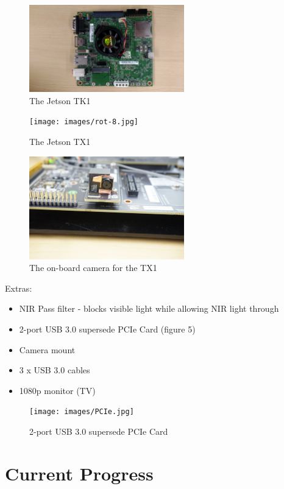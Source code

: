 \documentclass[letterpaper,10pt,titlepage]{IEEEtran}
\begin{document}
 \begin{figure}[!ht]
  \caption{The Jetson TK1}
	  \centering
		    \includegraphics[width=0.6\textwidth,natwidth=610,natheight=642]{images/rot-9.jpg}
				\end{figure}
\begin{figure}[!ht]
  \caption{The Jetson TX1}
	  \centering
		    \texttt{[image: images/rot-8.jpg]}
				\end{figure}
\begin{figure}[!ht]
  \caption{The on-board camera for the TX1}
	  \centering
		    \includegraphics[width=0.6\textwidth,natwidth=610,natheight=642]{images/onboardCamera.JPG}
				\end{figure}
	Extras: 
		\begin{itemize}
		\item NIR Pass filter - blocks visible light while allowing NIR light through
		\item 2-port USB 3.0 supersede PCIe Card (figure 5)
		\item Camera mount
		\item 3 x USB 3.0 cables
		\item 1080p monitor (TV)\\
		\end{itemize}

\begin{figure}[!ht]
  \caption{2-port USB 3.0 supersede PCIe Card}
	  \centering
		    \texttt{[image: images/PCIe.jpg]}
				\end{figure}


\section{Current Progress}
\end{document}
